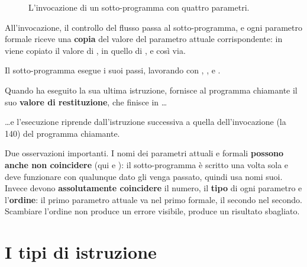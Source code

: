 \begin{figure}[H]
  \caption{L'invocazione di un sotto-programma con quattro parametri.}
  \label{fig:sottoprogramma}
\end{figure}

\begin{passi}
  \item All'invocazione, il controllo del flusso passa al sotto-programma,
        e ogni parametro formale riceve una \textbf{copia} del valore del
        parametro attuale corrispondente: in  viene copiato il
        valore di , in  quello di , e così via.
  \item Il sotto-programma esegue i suoi passi, lavorando con ,
        ,  e .
  \item Quando ha eseguito la sua ultima istruzione, fornisce al programma
        chiamante il suo \textbf{valore di restituzione}, che finisce in
        \dots
  \item \dots e l'esecuzione riprende dall'istruzione successiva a quella
        dell'invocazione (la 140) del programma chiamante.
\end{passi}

Due osservazioni importanti. I nomi dei parametri attuali e formali
\textbf{possono anche non coincidere} (qui  e ): il
sotto-programma è scritto una volta sola e deve funzionare con qualunque
dato gli venga passato, quindi usa nomi suoi. Invece devono
\textbf{assolutamente coincidere} il numero, il \textbf{tipo} di ogni
parametro e l'\textbf{ordine}: il primo parametro attuale va nel primo
formale, il secondo nel secondo. Scambiare l'ordine non produce un errore
visibile, produce un risultato sbagliato.

\section{I tipi di istruzione}

